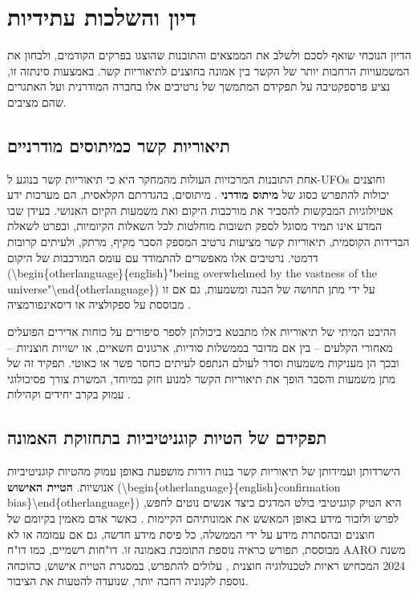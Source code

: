 \documentclass[12pt,a4paper]{article}
\begin{document}
\section{דיון והשלכות עתידיות}

הדיון הנוכחי שואף לסכם ולשלב את הממצאים והתובנות שהוצגו בפרקים הקודמים, ולבחון את המשמעויות הרחבות יותר של הקשר בין אמונה בחוצנים לתיאוריות קשר. באמצעות סינתזה זו, נציע פרספקטיבה על תפקידם המתמשך של נרטיבים אלו בחברה המודרנית ועל האתגרים שהם מציבים.

\subsection{תיאוריות קשר כמיתוסים מודרניים}
אחת התובנות המרכזיות העולות מהמחקר היא כי תיאוריות קשר בנוגע ל-UFOs וחוצנים יכולות להתפרש כסוג של \textbf{מיתוס מודרני} \cite{Wojcik2021Kahneman2011}. מיתוסים, בהגדרתם הקלאסית, הם מערכות ידע אטיולוגיות המבקשות להסביר את מורכבות היקום ואת משמעות הקיום האנושי. בעידן שבו המדע אינו תמיד מסוגל לספק תשובות מוחלטות לכל השאלות הקיומיות, ובפרט לשאלת הבדידות הקוסמית, תיאוריות קשר מציעות נרטיב המספק הסבר מקיף, מרתק, ולעיתים קרובות דרמטי. נרטיבים אלו מאפשרים להתמודד עם עומס המורכבות של היקום (\textbackslash{}begin\{otherlanguage\}\{english\}"being overwhelmed by the vastness of the universe"\textbackslash{}end\{otherlanguage\}) על ידי מתן תחושה של הבנה ומשמעות, גם אם זו מבוססת על ספקולציה או דיסאינפורמציה \cite{Wojcik2021Kahneman2011}.

ההיבט המיתי של תיאוריות אלו מתבטא ביכולתן לספר סיפורים על כוחות אדירים הפועלים מאחורי הקלעים – בין אם מדובר בממשלות סודיות, ארגונים חשאיים, או ישויות חוצניות – ובכך הן מעניקות משמעות וסדר לעולם הנתפס לעיתים כחסר פשר או כאוטי. תפקיד זה של מתן משמעות והסבר הופך את תיאוריות הקשר למנוע חזק במיוחד, המשרת צורך פסיכולוגי עמוק בקרב יחידים וקהילות \cite{Wojcik2021Kahneman2011}.

\subsection{תפקידם של הטיות קוגניטיביות בתחזוקת האמונה}
הישרדותן ועמידותן של תיאוריות קשר בנות דורות מושפעת באופן עמוק מהטיות קוגניטיביות אנושיות. \textbf{הטיית האישוש} (\textbackslash{}begin\{otherlanguage\}\{english\}confirmation bias\}\textbackslash{}end\{otherlanguage\}) היא הטיק קוגניטיבי בולט המדגים כיצד אנשים נוטים לחפש, לפרש ולזכור מידע באופן המאשש את אמונותיהם הקיימות \cite{Wojcik2021Kahneman2011}. כאשר אדם מאמין בקיומם של חוצנים ובהסתרת מידע על ידי הממשלה, כל פיסת מידע חדשה, גם אם עמומה או לא מבוססת, תפורש כראיה נוספת התומכת באמונה זו. דו"חות רשמיים, כמו דו"ח AARO משנת 2024 המכחיש ראיות לטכנולוגיה חוצנית \cite{AARO2024report}, עלולים להתפרש, במסגרת הטיית אישוש, כהוכחה נוספת לקנוניה רחבה יותר, שנועדה להטעות את הציבור.
\end{document}
